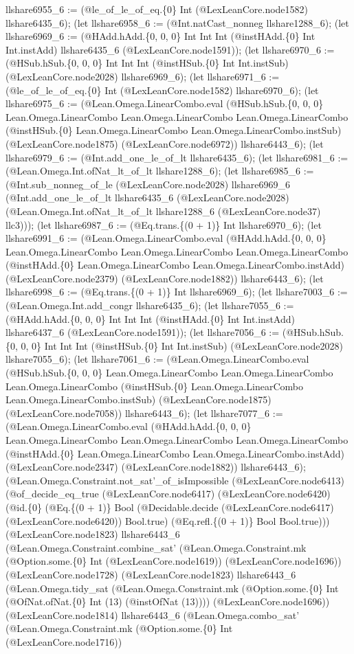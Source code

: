 \documentclass[11pt]{article}
\begin{document}
llshare6955\_6 := (@le\_of\_le\_of\_eq.\{0\} Int (@LexLeanCore.node1582) llshare6435\_6); (let llshare6958\_6 := (@Int.natCast\_nonneg llshare1288\_6); (let llshare6969\_6 := (@HAdd.hAdd.\{0, 0, 0\} Int Int Int (@instHAdd.\{0\} Int Int.instAdd) llshare6435\_6 (@LexLeanCore.node1591)); (let llshare6970\_6 := (@HSub.hSub.\{0, 0, 0\} Int Int Int (@instHSub.\{0\} Int Int.instSub) (@LexLeanCore.node2028) llshare6969\_6); (let llshare6971\_6 := (@le\_of\_le\_of\_eq.\{0\} Int (@LexLeanCore.node1582) llshare6970\_6); (let llshare6975\_6 := (@Lean.Omega.LinearCombo.eval (@HSub.hSub.\{0, 0, 0\} Lean.Omega.LinearCombo Lean.Omega.LinearCombo Lean.Omega.LinearCombo (@instHSub.\{0\} Lean.Omega.LinearCombo Lean.Omega.LinearCombo.instSub) (@LexLeanCore.node1875) (@LexLeanCore.node6972)) llshare6443\_6); (let llshare6979\_6 := (@Int.add\_one\_le\_of\_lt llshare6435\_6); (let llshare6981\_6 := (@Lean.Omega.Int.ofNat\_lt\_of\_lt llshare1288\_6); (let llshare6985\_6 := (@Int.sub\_nonneg\_of\_le (@LexLeanCore.node2028) llshare6969\_6 (@Int.add\_one\_le\_of\_lt llshare6435\_6 (@LexLeanCore.node2028) (@Lean.Omega.Int.ofNat\_lt\_of\_lt llshare1288\_6 (@LexLeanCore.node37) llc3))); (let llshare6987\_6 := (@Eq.trans.\{(0 + 1)\} Int llshare6970\_6); (let llshare6991\_6 := (@Lean.Omega.LinearCombo.eval (@HAdd.hAdd.\{0, 0, 0\} Lean.Omega.LinearCombo Lean.Omega.LinearCombo Lean.Omega.LinearCombo (@instHAdd.\{0\} Lean.Omega.LinearCombo Lean.Omega.LinearCombo.instAdd) (@LexLeanCore.node2379) (@LexLeanCore.node1882)) llshare6443\_6); (let llshare6998\_6 := (@Eq.trans.\{(0 + 1)\} Int llshare6969\_6); (let llshare7003\_6 := (@Lean.Omega.Int.add\_congr llshare6435\_6); (let llshare7055\_6 := (@HAdd.hAdd.\{0, 0, 0\} Int Int Int (@instHAdd.\{0\} Int Int.instAdd) llshare6437\_6 (@LexLeanCore.node1591)); (let llshare7056\_6 := (@HSub.hSub.\{0, 0, 0\} Int Int Int (@instHSub.\{0\} Int Int.instSub) (@LexLeanCore.node2028) llshare7055\_6); (let llshare7061\_6 := (@Lean.Omega.LinearCombo.eval (@HSub.hSub.\{0, 0, 0\} Lean.Omega.LinearCombo Lean.Omega.LinearCombo Lean.Omega.LinearCombo (@instHSub.\{0\} Lean.Omega.LinearCombo Lean.Omega.LinearCombo.instSub) (@LexLeanCore.node1875) (@LexLeanCore.node7058)) llshare6443\_6); (let llshare7077\_6 := (@Lean.Omega.LinearCombo.eval (@HAdd.hAdd.\{0, 0, 0\} Lean.Omega.LinearCombo Lean.Omega.LinearCombo Lean.Omega.LinearCombo (@instHAdd.\{0\} Lean.Omega.LinearCombo Lean.Omega.LinearCombo.instAdd) (@LexLeanCore.node2347) (@LexLeanCore.node1882)) llshare6443\_6); (@Lean.Omega.Constraint.not\_sat'\_of\_isImpossible (@LexLeanCore.node6413) (@of\_decide\_eq\_true (@LexLeanCore.node6417) (@LexLeanCore.node6420) (@id.\{0\} (@Eq.\{(0 + 1)\} Bool (@Decidable.decide (@LexLeanCore.node6417) (@LexLeanCore.node6420)) Bool.true) (@Eq.refl.\{(0 + 1)\} Bool Bool.true))) (@LexLeanCore.node1823) llshare6443\_6 (@Lean.Omega.Constraint.combine\_sat' (@Lean.Omega.Constraint.mk (@Option.some.\{0\} Int (@LexLeanCore.node1619)) (@LexLeanCore.node1696)) (@LexLeanCore.node1728) (@LexLeanCore.node1823) llshare6443\_6 (@Lean.Omega.tidy\_sat (@Lean.Omega.Constraint.mk (@Option.some.\{0\} Int (@OfNat.ofNat.\{0\} Int (13) (@instOfNat (13)))) (@LexLeanCore.node1696)) (@LexLeanCore.node1814) llshare6443\_6 (@Lean.Omega.combo\_sat' (@Lean.Omega.Constraint.mk (@Option.some.\{0\} Int (@LexLeanCore.node1716)) 
\end{document}
